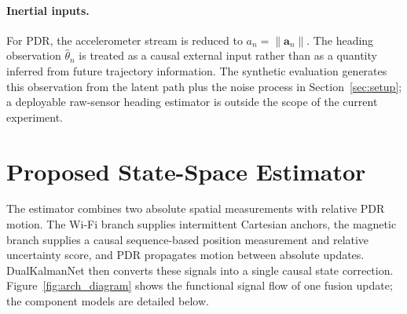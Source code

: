 \documentclass[conference]{IEEEtran}
\begin{document}
\paragraph{Inertial inputs.}
For PDR, the accelerometer stream is reduced to $a_n=\|\mathbf{a}_n\|$. The heading observation $\hat{\theta}_n$ is treated as a causal external input rather than as a quantity inferred from future trajectory information. The synthetic evaluation generates this observation from the latent path plus the noise process in Section~\ref{sec:setup}; a deployable raw-sensor heading estimator is outside the scope of the current experiment.

\section{Proposed State-Space Estimator}\label{sec:architecture}

The estimator combines two absolute spatial measurements with relative PDR motion. The Wi-Fi branch supplies intermittent Cartesian anchors, the magnetic branch supplies a causal sequence-based position measurement and relative uncertainty score, and PDR propagates motion between absolute updates. DualKalmanNet then converts these signals into a single causal state correction. Figure~\ref{fig:arch_diagram} shows the functional signal flow of one fusion update; the component models are detailed below.
\end{document}
